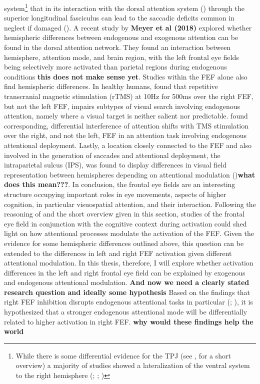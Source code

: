 \documentclass[a4paper, 12pt]{scrreprt}
\begin{document}
system\footnote{While there is some differential evidence for the TPJ (see \textcite{vossel2014dorsal}, for a short overview) a majority of studies showed a lateralization of the ventral system to the right hemisphere (\cite{corbetta2002control}; \cite{fox2006spontaneous}; \cite{corbetta2008reorienting})} that in its interaction with the dorsal attention system (\cite{he2007breakdown}) through the superior longitudinal fasciculus can lead to the saccadic deficits common in neglect if damaged (\cite{friston2018neglect}). A recent study by \textbf{Meyer et al (2018)} explored whether hemispheric differences between endogenous and exogenous attention can be found  in the dorsal attention network. They found an interaction between hemisphere, attention mode, and brain region, with the left frontal eye fields being selectively more activated than parietal regions during endogenous conditions \textbf{this does not make sense yet}. Studies within the FEF alone also find hemispheric differences. In healthy humans, \textcite{muggleton2003human} found that repetitive transcranial magnetic stimulation (rTMS) at 10Hz for 500ms over the right FEF, but not the left FEF, impairs subtypes of visual search involving endogenous attention, namely where a visual target is neither salient nor predictable. \textcite{grosbras2002transcranial} found  corresponding, differential interference of attention shifts with TMS stimulation over the right, and not the left, FEF in an attention task involving endogenous attentional deployment. Lastly, a location closely connected to the FEF and also involved in the generation of saccades and attentional deployment, the intraparietal sulcus (IPS), was found to display differences in visual field representation between hemispheres depending on attentional modulation (\cite{sheremata2015hemisphere})\textbf{what does this mean???}.\newline
In conclusion, the frontal eye fields are an interesting structure occupying important roles in eye movements, aspects of higher cognition, in particular visuospatial attention, and their interaction. Following the reasoning of \textcite{vernet2014corrigendum} and the short overview given in this section, studies of the frontal eye field in conjunction with the cognitive context during activation could shed light on how attentional processes modulate the activation of the FEF. Given the evidence for some hemispheric differences outlined above, this question can be extended to the differences in left and right FEF activation given different attentional modulation.
In this thesis, therefore, I will explore whether activation differences in the left and right frontal eye field can be explained by exogenous and endogenous attentional modulation. \textbf{And now we need a clearly stated research question and ideally some hypothesis} Based on the findings that right FEF inhibition disrupts endogenous attentional tasks in particular (\cite{muggleton2003human}; \cite{grosbras2002transcranial}), it is hypothesized that a stronger endogenous attentional mode will be differentially related to higher activation in right FEF. \textbf{why would these findings help the world}\newline
\end{document}
